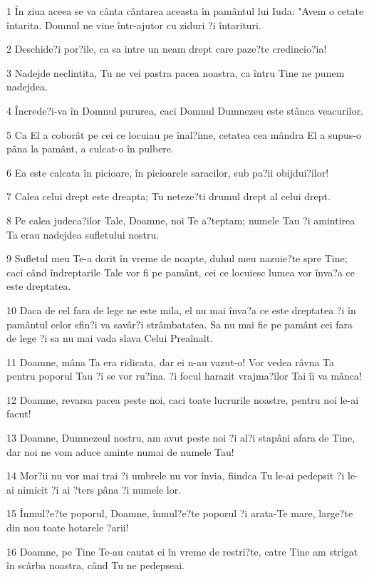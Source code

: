 \par 1 În ziua aceea se va cânta cântarea aceasta în pamântul lui Iuda: "Avem o cetate întarita. Domnul ne vine într-ajutor cu ziduri ?i întarituri.
\par 2 Deschide?i por?ile, ca sa intre un neam drept care paze?te credincio?ia!
\par 3 Nadejde neclintita, Tu ne vei pastra pacea noastra, ca întru Tine ne punem nadejdea.
\par 4 Încrede?i-va în Domnul pururea, caci Domnul Dumnezeu este stânca veacurilor.
\par 5 Ca El a coborât pe cei ce locuiau pe înal?ime, cetatea cea mândra El a supus-o pâna la pamânt, a culcat-o în pulbere.
\par 6 Ea este calcata în picioare, în picioarele saracilor, sub pa?ii obijdui?ilor!
\par 7 Calea celui drept este dreapta; Tu neteze?ti drumul drept al celui drept.
\par 8 Pe calea judeca?ilor Tale, Doamne, noi Te a?teptam; numele Tau ?i amintirea Ta erau nadejdea sufletului nostru.
\par 9 Sufletul meu Te-a dorit în vreme de noapte, duhul meu nazuie?te spre Tine; caci când îndreptarile Tale vor fi pe pamânt, cei ce locuiesc lumea vor înva?a ce este dreptatea.
\par 10 Daca de cel fara de lege ne este mila, el nu mai înva?a ce este dreptatea ?i în pamântul celor sfin?i va savâr?i strâmbatatea. Sa nu mai fie pe pamânt cei fara de lege ?i sa nu mai vada slava Celui Preaînalt.
\par 11 Doamne, mâna Ta era ridicata, dar ei n-au vazut-o! Vor vedea râvna Ta pentru poporul Tau ?i se vor ru?ina. ?i focul harazit vrajma?ilor Tai îi va mânca!
\par 12 Doamne, revarsa pacea peste noi, caci toate lucrurile noastre, pentru noi le-ai facut!
\par 13 Doamne, Dumnezeul nostru, am avut peste noi ?i al?i stapâni afara de Tine, dar noi ne vom aduce aminte numai de numele Tau!
\par 14 Mor?ii nu vor mai trai ?i umbrele nu vor învia, fiindca Tu le-ai pedepsit ?i le-ai nimicit ?i ai ?ters pâna ?i numele lor.
\par 15 Înmul?e?te poporul, Doamne, înmul?e?te poporul ?i arata-Te mare, large?te din nou toate hotarele ?arii!
\par 16 Doamne, pe Tine Te-au cautat ei în vreme de restri?te, catre Tine am strigat în scârba noastra, când Tu ne pedepseai.
